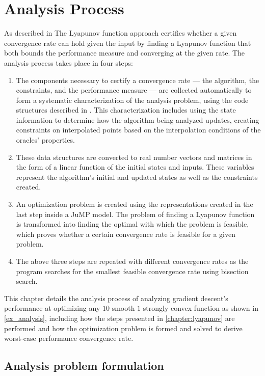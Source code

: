 \chapter{Analysis Process}\label{chapter:process}

As described in  The Lyapunov function approach certifies whether a given convergence rate can hold given the input by finding a Lyapunov function that both bounds the performance measure and converging at the given rate. The analysis process takes place in four steps:

\begin{enumerate}
    \item The components necessary to certify a convergence rate --- the algorithm, the constraints, and the performance measure --- are collected automatically to form a systematic characterization of the analysis problem, using the code structures described in . This characterization includes using the state information to determine how the algorithm being analyzed updates, creating constraints on interpolated points based on the interpolation conditions of the oracles' properties.
    \item These data structures are converted to real number vectors and matrices in the form of a linear function of the initial states and inputs. These variables represent the algorithm's initial and updated states as well as the constraints created.
    \item An optimization problem is created using the representations created in the last step inside a JuMP model. The problem of finding a Lyapunov function is transformed into finding the optimal with which the problem is feasible, which proves whether a certain convergence rate is feasible for a given problem.
    \item The above three steps are repeated with different convergence rates as the program searches for the smallest feasible convergence rate using bisection search.
\end{enumerate}

This chapter details the analysis process of analyzing gradient descent's performance at optimizing any $10$ smooth $1$ strongly convex function as shown in \cref{ex_analysis}, including how the steps presented in \cref{chapter:lyapunov} are performed and how the optimization problem is formed and solved to derive worst-case performance convergence rate.

\section{Analysis problem formulation} \label{sec_collect}

